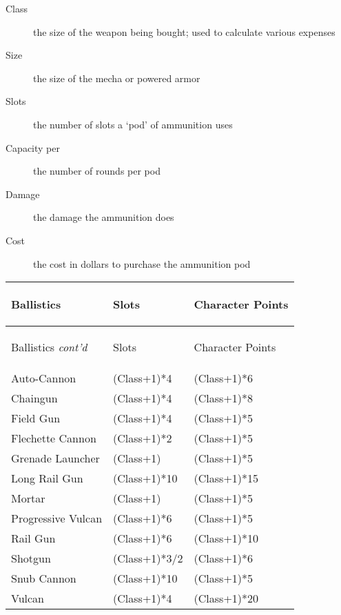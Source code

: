 \documentclass[twoside]{book}
\begin{document}
\begin{description}
    
  \item[ Class ] 
    {  
     the size of the weapon being bought; used to
                 calculate various expenses 
    }
  
  \item[ Size ] 
    {  
     the size of the mecha or powered armor 
    }
  
  \item[ Slots ] 
    {  
     the number of slots a `pod' of
                 ammunition uses 
    }
  
  \item[ Capacity per ] 
    {  
     the number of rounds per pod 
    }
  
  \item[ Damage ] 
    {  
     the damage the ammunition does 
    }
  
  \item[ Cost ] 
    {  
     the cost in dollars to purchase the ammunition
                 pod 
    }
  
\end{description}
  
\begin{longtable}{p{1.25in}ll} 
  Ballistics& \begin{turn}{70}{Slots}\end{turn}
          & \begin{turn}{70}{Character Points}\end{turn}
          \\
  \hline
  \hline
  \endfirsthead
  Ballistics \textit{cont'd}
        & \begin{turn}{70}{Slots}\end{turn}
          & \begin{turn}{70}{Character Points}\end{turn}
           \\
  \hline
  \endhead
\raggedright  Auto-Cannon& (Class+1)*4& (Class+1)*6\tabularnewline
      \raggedright  Chaingun& (Class+1)*4& (Class+1)*8\tabularnewline
      \raggedright  Field Gun& (Class+1)*4& (Class+1)*5\tabularnewline
      \raggedright  Flechette Cannon& (Class+1)*2& (Class+1)*5\tabularnewline
      \raggedright  Grenade Launcher& (Class+1)& (Class+1)*5\tabularnewline
      \raggedright  Long Rail Gun& (Class+1)*10& (Class+1)*15\tabularnewline
      \raggedright  Mortar& (Class+1)& (Class+1)*5\tabularnewline
      \raggedright  Progressive Vulcan& (Class+1)*6& (Class+1)*5\tabularnewline
      \raggedright  Rail Gun& (Class+1)*6& (Class+1)*10\tabularnewline
      \raggedright  Shotgun& (Class+1)*3/2& (Class+1)*6\tabularnewline
      \raggedright  Snub Cannon& (Class+1)*10& (Class+1)*5\tabularnewline
      \raggedright  Vulcan& (Class+1)*4& (Class+1)*20\tabularnewline
      
\end{longtable}
    
\end{document}
